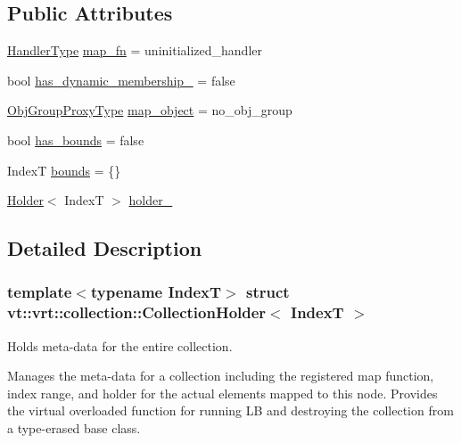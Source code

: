 \subsection*{Public Attributes}
\begin{DoxyCompactItemize}
\item 
\hyperlink{namespacevt_af64846b57dfcaf104da3ef6967917573}{Handler\+Type} \hyperlink{structvt_1_1vrt_1_1collection_1_1_collection_holder_a6e82cbf6cf04497082fb47e79e5dd936}{map\+\_\+fn} = uninitialized\+\_\+handler
\item 
bool \hyperlink{structvt_1_1vrt_1_1collection_1_1_collection_holder_a1a67e8f72b7ba6c8ef83577228b9cf32}{has\+\_\+dynamic\+\_\+membership\+\_\+} = false
\item 
\hyperlink{namespacevt_ad7cae989df485fccca57f0792a880a8e}{Obj\+Group\+Proxy\+Type} \hyperlink{structvt_1_1vrt_1_1collection_1_1_collection_holder_a8f2585c00115e40a4d3617e7c03129a4}{map\+\_\+object} = no\+\_\+obj\+\_\+group
\item 
bool \hyperlink{structvt_1_1vrt_1_1collection_1_1_collection_holder_a49ce5f97af60bb36af69d35a4364f2a9}{has\+\_\+bounds} = false
\item 
IndexT \hyperlink{structvt_1_1vrt_1_1collection_1_1_collection_holder_abc736d9b5626b8207433d3c9d0383f6a}{bounds} = \{\}
\item 
\hyperlink{structvt_1_1vrt_1_1collection_1_1_holder}{Holder}$<$ IndexT $>$ \hyperlink{structvt_1_1vrt_1_1collection_1_1_collection_holder_a9b59adb37c13335d7cc3c99b4fb1b725}{holder\+\_\+}
\end{DoxyCompactItemize}


\subsection{Detailed Description}
\subsubsection*{template$<$typename IndexT$>$\newline
struct vt\+::vrt\+::collection\+::\+Collection\+Holder$<$ Index\+T $>$}

Holds meta-\/data for the entire collection. 

Manages the meta-\/data for a collection including the registered map function, index range, and holder for the actual elements mapped to this node. Provides the virtual overloaded function for running LB and destroying the collection from a type-\/erased base class. 

